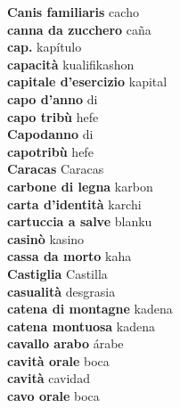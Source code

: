 \textbf{ Canis familiaris  } cacho \\
\textbf{ canna da zucchero  } caña \\
\textbf{ cap.  } kapítulo \\
\textbf{ capacità  } kualifikashon \\
\textbf{ capitale d’esercizio  } kapital \\
\textbf{ capo d’anno  } di \\
\textbf{ capo tribù  } hefe \\
\textbf{ Capodanno  } di \\
\textbf{ capotribù  } hefe \\
\textbf{ Caracas  } Caracas \\
\textbf{ carbone di legna  } karbon \\
\textbf{ carta d’identità  } karchi \\
\textbf{ cartuccia a salve  } blanku \\
\textbf{ casinò  } kasino \\
\textbf{ cassa da morto  } kaha \\
\textbf{ Castiglia  } Castilla \\
\textbf{ casualità  } desgrasia \\
\textbf{ catena di montagne  } kadena \\
\textbf{ catena montuosa  } kadena \\
\textbf{ cavallo arabo  } árabe \\
\textbf{ cavità orale  } boca \\
\textbf{ cavità  } cavidad \\
\textbf{ cavo orale  } boca \\
